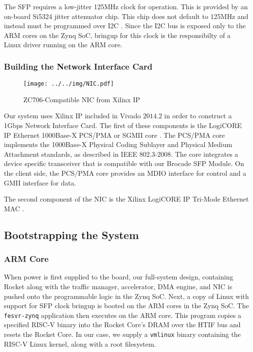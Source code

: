     The SFP requires a low-jitter 125MHz clock for operation. This is provided
    by an on-board Si5324 jitter attenuator chip. This chip does not default to 
    125MHz and instead must be programmed over I2C \cite{xapp1082}. Since the I2C bus is exposed
    only to the ARM cores on the Zynq SoC, bringup for this clock is the 
    responsibilty of a Linux driver running on the ARM core.

\subsubsection{Building the Network Interface Card}

\begin{figure}[t]
\begin{center}
\label{fig:nic}
\texttt{[image: ../../img/NIC.pdf]}
\caption{ZC706-Compatible NIC from Xilinx IP}
\end{center}
\end{figure}



    Our system uses Xilinx IP included in Vivado $2014.2$ in order to construct 
    a 1Gbps Network Interface Card. The first of these components is the LogiCORE
    IP Ethernet 1000Base-X PCS/PMA or SGMII core \cite{pcspma}. The PCS/PMA
    core implements the 1000Base-X Physical Coding Sublayer and Physical Medium
    Attachment standards, as described in IEEE 802.3-2008. The core integrates
    a device specific transceiver that is compatible with our Brocade SFP Module.
    On the client side, the PCS/PMA core provides an MDIO interface for control
    and a GMII interface for data.

    The second component of the NIC is the Xilinx LogiCORE IP Tri-Mode Ethernet 
    MAC \cite{trimac}. 

\subsection{Bootstrapping the System}
    \subsubsection{ARM Core}

    When power is first supplied to the board, our full-system design, containing
    Rocket along with the traffic manager, accelerator, DMA engine, and NIC is 
    pushed onto the programmable logic in the Zynq SoC. Next, a copy of Linux
    with support for SFP clock bringup is booted on the ARM cores in the Zynq
    SoC. The \texttt{fesvr-zynq} application then executes on the ARM core. 
    This program copies a specified RISC-V binary into the Rocket Core's DRAM 
    over the HTIF bus and resets the Rocket Core. In our case, we supply a 
    \texttt{vmlinux} binary containing the RISC-V Linux kernel, along with a 
    root filesystem.

